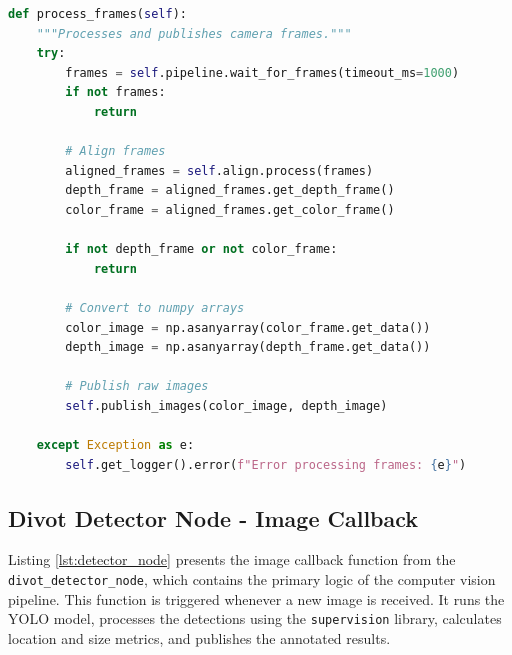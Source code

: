 \begin{lstlisting}[language=Python, caption={Core frame processing logic from \texttt{camera\_node.py}.}, label={lst:camera_node}]
def process_frames(self):
    """Processes and publishes camera frames."""
    try:
        frames = self.pipeline.wait_for_frames(timeout_ms=1000)
        if not frames:
            return
        
        # Align frames
        aligned_frames = self.align.process(frames)
        depth_frame = aligned_frames.get_depth_frame()
        color_frame = aligned_frames.get_color_frame()
        
        if not depth_frame or not color_frame:
            return
            
        # Convert to numpy arrays
        color_image = np.asanyarray(color_frame.get_data())
        depth_image = np.asanyarray(depth_frame.get_data())
        
        # Publish raw images
        self.publish_images(color_image, depth_image)
        
    except Exception as e:
        self.get_logger().error(f"Error processing frames: {e}")
\end{lstlisting}

\subsection{Divot Detector Node - Image Callback}
Listing \ref{lst:detector_node} presents the image callback function from the \texttt{divot\_detector\_node}, which contains the primary logic of the computer vision pipeline. This function is triggered whenever a new image is received. It runs the YOLO model, processes the detections using the \texttt{supervision} library, calculates location and size metrics, and publishes the annotated results.

